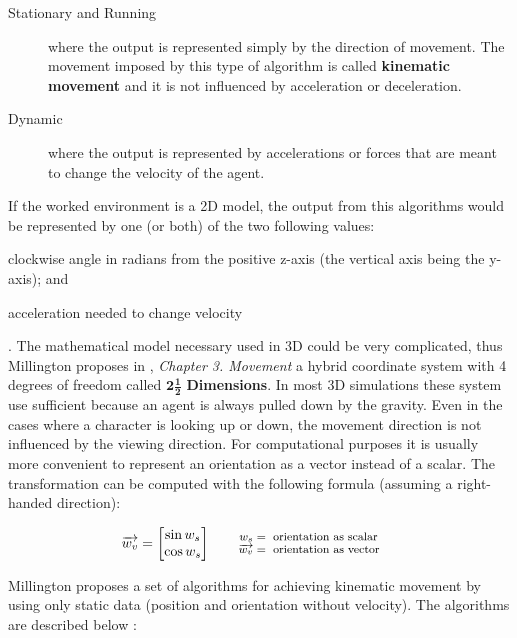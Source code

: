 \begin{description}
  \item [Stationary and Running] where the output is represented simply by the 
  direction of movement. The movement imposed by this type of algorithm is called
  \textbf{kinematic movement} and it is not influenced by acceleration or
  deceleration.
  \item [Dynamic] where the output is represented by accelerations or forces
  that are meant to change the velocity of the agent.
\end{description}

If the worked environment is a 2D model, the output from this algorithms would
  be represented by one (or both) of the two following values:
\begin{inparaenum}
\item clockwise angle in radians from the positive z-axis (the vertical axis 
being the y-axis); and
\item acceleration needed to change velocity
\end{inparaenum}.
The mathematical model necessary used in 3D could be very complicated, thus 
Millington proposes in \cite{ai-games}, \textit{Chapter 3. Movement} a hybrid 
coordinate system with 4 degrees of freedom called $\mathbf{2\frac{1}{2}}$
\textbf{Dimensions}. In most 3D simulations these system use sufficient because 
an agent is always pulled down by the gravity. Even in the cases where a character
is looking up or down, the movement direction is not influenced by the viewing 
direction. For computational purposes it is usually more convenient to represent
an orientation as a vector instead of a scalar. The transformation can be computed
with the following formula (assuming a right-handed direction):

\begin{equation}
\overrightarrow {w_{v}} = 
  \begin{bmatrix}
\sin w_{s} \\ \cos w_{s}
  \end{bmatrix}
\qquad\parbox{4.0cm}{\footnotesize$\begin{aligned} 
  w_{s} &= \text{ orientation as scalar}
  \\[-1.0ex] \overrightarrow {w_{v}} &= \text{ orientation as vector}
  \end{aligned}$}
\label{eqn:scalar-to-vector}
\end{equation}

Millington proposes a set of algorithms for achieving kinematic movement by 
using only static data (position and orientation without velocity). The algorithms
are described below \cite{ai-games}:

